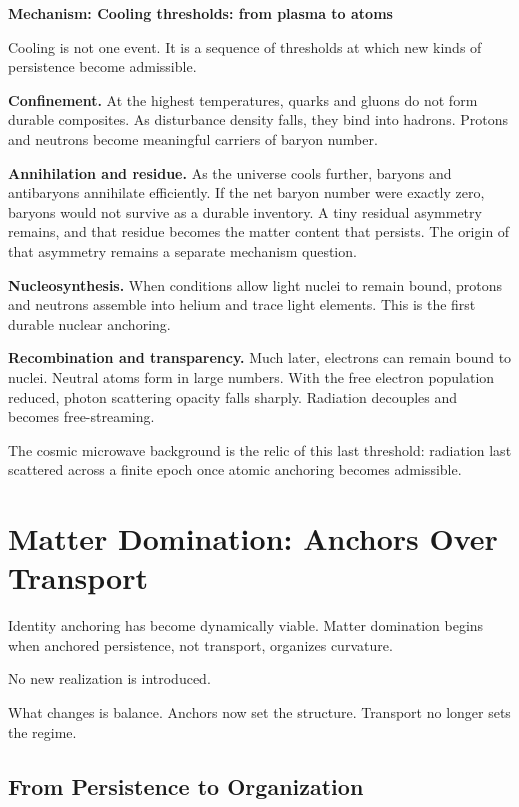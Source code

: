 \documentclass[11pt,twoside,openright]{book}
\newenvironment{mechanismbox}[1]
  {\begin{framed}\noindent\textbf{Mechanism: #1}\par\medskip}
  {\end{framed}}
\begin{document}
\begin{mechanismbox}{Cooling thresholds: from plasma to atoms}

Cooling is not one event. It is a sequence of thresholds at which new kinds of persistence become admissible.

\textbf{Confinement.}
At the highest temperatures,
quarks and gluons do not form durable composites.
As disturbance density falls,
they bind into hadrons.
Protons and neutrons become meaningful carriers of baryon number.

\textbf{Annihilation and residue.}
As the universe cools further,
baryons and antibaryons annihilate efficiently.
If the net baryon number were exactly zero,
baryons would not survive as a durable inventory.
A tiny residual asymmetry remains,
and that residue becomes the matter content that persists.
The origin of that asymmetry remains a separate mechanism question.

\textbf{Nucleosynthesis.}
When conditions allow light nuclei to remain bound,
protons and neutrons assemble into helium and trace light elements.
This is the first durable nuclear anchoring.

\textbf{Recombination and transparency.}
Much later,
electrons can remain bound to nuclei.
Neutral atoms form in large numbers.
With the free electron population reduced,
photon scattering opacity falls sharply.
Radiation decouples and becomes free-streaming.

The cosmic microwave background is the relic of this last threshold: radiation last scattered across a finite epoch once atomic anchoring becomes admissible.

\end{mechanismbox}
\chapter{Matter Domination: Anchors Over Transport}

Identity anchoring has become dynamically viable. Matter domination begins when anchored persistence, not transport, organizes curvature.

No new realization is introduced.

What changes is balance. Anchors now set the structure. Transport no longer sets the regime.

\section*{From Persistence to Organization}
\end{document}
